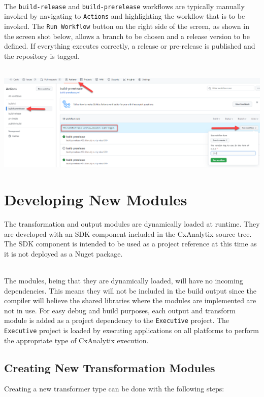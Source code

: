 \noindent\\The \texttt{build-release} and \texttt{build-prerelease} workflows are typically manually invoked by navigating to \texttt{Actions}
and highlighting the workflow that is to be invoked.  The \texttt{Run Workflow} button on the right side of the screen, as shown in the screen
shot below, allows a branch to be chosen and a release version to be defined.  If everything executes correctly, a release or pre-release
is published and the repository is tagged.

\noindent\\\includegraphics[scale=.4]{graphics/github-workflow.png}

\section{Developing New Modules}

The transformation and output modules are dynamically loaded at runtime.  They are developed with an SDK component included in the CxAnalytix source tree.
The SDK component is intended to be used as a project reference at this time as it is not deployed as a Nuget package.

\noindent\\The modules, being that they are dynamically loaded, will have no incoming dependencies.  This means they will not be included
in the build output since the compiler will believe the shared libraries where the modules are implemented are not in use.  For easy debug and build
purposes, each output and transform module is added as a project dependency to the \texttt{Executive} project.  The \texttt{Executive} project
is loaded by executing applications on all platforms to perform the appropriate type of CxAnalytix execution.


\subsection{Creating New Transformation Modules}

Creating a new transformer type can be done with the following steps:

